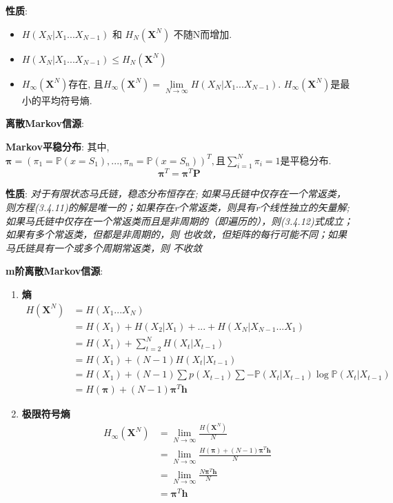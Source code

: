 \documentclass{article}
\newcommand{\env}[2]{\begin{#1}#2\end{#1}}
\newcommand{\bb}{\boldsymbol}
\newcommand{\P}{\mathbb P}
\begin{document}
                \textbf{性质}: 
                    \env{itemize}{
                    \item $H(X_N | X_1 ... X_{N-1})$ 和 $H_N(\bb X^N)$ 不随N而增加.
                    \item $H(X_N | X_1 ... X_{N-1}) \le H_N(\bb X^N)$
                    \item $H_\infty(\bb X^N)$存在, 且$H_\infty(\bb X^N) = \lim\limits_{N \to \infty} H(X_N | X_1 ... X_{N-1})$. $H_\infty(\bb X^N)$是最小的平均符号熵.
                    }
                

        \textbf{离散Markov信源}:
        
            \textbf{Markov平稳分布}: 其中, $\bb \pi = (\pi_1 = \P(x = S_1), ..., \pi_n = \P(x = S_n))^T, \text{且} \sum\limits_{i=1}^N \pi_i = 1$是平稳分布.
                $$\bb \pi^T = \bb \pi^T \bb P$$
                
                \textbf{性质}: \textit{对于有限状态马氏链，稳态分布恒存在; 如果马氏链中仅存在一个常返类，则方程(3.4.11)的解是唯一的；如果存在r个常返类，则具有r个线性独立的矢量解; 如果马氏链中仅存在一个常返类而且是非周期的（即遍历的），则(3.4.12)式成立；如果有多个常返类，但都是非周期的，则       也收敛，但矩阵的每行可能不同；如果马氏链具有一个或多个周期常返类，则      不收敛}

        \textbf{m阶离散Markov信源}:
            \env{enumerate}{
            \item \textbf{熵}
                \env{align*}{
                    H(\bb X^N) &= H(X_1 ... X_N)\\
                    &= H(X_1) + H(X_2|X_1) + ... + H(X_N | X_{N-1} ... X_1) \tag{条件熵展开}\\
                    &= H(X_1) + \sum\limits_{t=2}^N H(X_t | X_{t-1}) \tag{Markov性}\\
                    &= H(X_1) + (N-1) H(X_t | X_{t-1}) \tag{平稳性}\\
                    &= H(X_1) + (N-1) \sum p(X_{t-1}) \sum - \P(X_t | X_{t-1}) \log \P(X_t | X_{t-1}) \tag{条件熵代入}\\
                    &= H(\bb \pi) + (N-1)  \bb \pi^T \bb h \tag{平稳分布$\bb \pi$代入}
                }
            \item \textbf{极限符号熵}
                \env{align*}{
                    H_\infty(\bb X^N) &= \lim\limits_{N \to \infty}\frac{H(\bb X^N)}{N} \tag{定义}\\
                    &= \lim\limits_{N \to \infty} \frac{H(\bb \pi) + (N-1)  \bb \pi^T \bb h}{N} \tag{代入}\\
                    &= \lim\limits_{N \to \infty} \frac{N \bb \pi^T \bb h}{N} \tag{省略$\to 0$量}\\
                    &= \bb \pi^T \bb h
                }
            }
\end{document}
